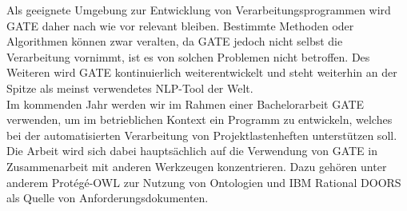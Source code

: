 \documentclass[12pt]{report}
\begin{document}
Als geeignete Umgebung zur Entwicklung von Verarbeitungsprogrammen wird GATE daher nach wie vor relevant bleiben. Bestimmte Methoden oder Algorithmen können zwar veralten, da GATE jedoch nicht selbst die Verarbeitung vornimmt, ist es von solchen Problemen nicht betroffen. Des Weiteren wird GATE kontinuierlich weiterentwickelt und steht weiterhin an der Spitze als meinst verwendetes NLP-Tool der Welt. \\

Im kommenden Jahr werden wir im Rahmen einer Bachelorarbeit GATE verwenden, um im betrieblichen Kontext ein Programm zu entwickeln, welches bei der automatisierten Verarbeitung von Projektlastenheften unterstützen soll. Die Arbeit wird sich dabei hauptsächlich auf die Verwendung von GATE in Zusammenarbeit mit anderen Werkzeugen konzentrieren. Dazu gehören unter anderem Protégé-OWL zur Nutzung von Ontologien und IBM Rational DOORS als Quelle von Anforderungsdokumenten.
\end{document}
